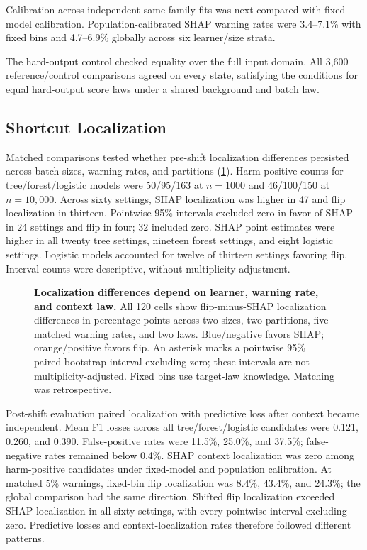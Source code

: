 \documentclass[conference]{IEEEtran}
\begin{document}
Calibration across independent same-family fits was next compared with fixed-model calibration. Population-calibrated SHAP warning rates were 3.4--7.1\% with fixed bins and 4.7--6.9\% globally across six learner/size strata.

The hard-output control checked equality over the full input domain. All 3,600 reference/control comparisons agreed on every state, satisfying the conditions for equal hard-output score laws under a shared background and batch law.

\subsection{Shortcut Localization}
Matched comparisons tested whether pre-shift localization differences persisted across batch sizes, warning rates, and partitions (\cref{fig:matched-localization}). Harm-positive counts for tree/forest/logistic models were 50/95/163 at $n=1000$ and 46/100/150 at $n=10{,}000$. Across sixty settings, SHAP localization was higher in 47 and flip localization in thirteen. Pointwise 95\% intervals excluded zero in favor of SHAP in 24 settings and flip in four; 32 included zero. SHAP point estimates were higher in all twenty tree settings, nineteen forest settings, and eight logistic settings. Logistic models accounted for twelve of thirteen settings favoring flip. Interval counts were descriptive, without multiplicity adjustment.

\begin{figure}[!t]
\centering

\caption{\textbf{Localization differences depend on learner, warning rate, and context law.} All 120 cells show flip-minus-SHAP localization differences in percentage points across two sizes, two partitions, five matched warning rates, and two laws. Blue/negative favors SHAP; orange/positive favors flip. An asterisk marks a pointwise 95\% paired-bootstrap interval excluding zero; these intervals are not multiplicity-adjusted. Fixed bins use target-law knowledge. Matching was retrospective.}
\label{fig:matched-localization}
\end{figure}

Post-shift evaluation paired localization with predictive loss after context became independent. Mean F1 losses across all tree/forest/logistic candidates were 0.121, 0.260, and 0.390. False-positive rates were 11.5\%, 25.0\%, and 37.5\%; false-negative rates remained below 0.4\%. SHAP context localization was zero among harm-positive candidates under fixed-model and population calibration. At matched 5\% warnings, fixed-bin flip localization was 8.4\%, 43.4\%, and 24.3\%; the global comparison had the same direction. Shifted flip localization exceeded SHAP localization in all sixty settings, with every pointwise interval excluding zero. Predictive losses and context-localization rates therefore followed different patterns.
\end{document}
